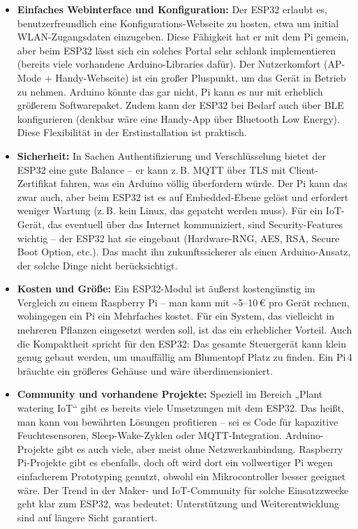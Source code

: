 \begin{itemize}[leftmargin=*]
    \item \textbf{Einfaches Webinterface und Konfiguration:} Der ESP32 erlaubt es, benutzerfreundlich eine Konfigurations-Webseite zu hosten, etwa um initial WLAN-Zugangsdaten einzugeben. Diese Fähigkeit hat er mit dem Pi gemein, aber beim ESP32 lässt sich ein solches Portal sehr schlank implementieren (bereits viele vorhandene Arduino-Libraries dafür). Der Nutzerkomfort (AP-Mode + Handy-Webseite) ist ein großer Pluspunkt, um das Gerät in Betrieb zu nehmen. Arduino könnte das gar nicht, Pi kann es nur mit erheblich größerem Softwarepaket. Zudem kann der ESP32 bei Bedarf auch über BLE konfigurieren (denkbar wäre eine Handy-App über Bluetooth Low Energy). Diese Flexibilität in der Erstinstallation ist praktisch.
    
    \item \textbf{Sicherheit:} In Sachen Authentifizierung und Verschlüsselung bietet der ESP32 eine gute Balance – er kann z.\,B. MQTT über TLS mit Client-Zertifikat fahren, was ein Arduino völlig überfordern würde. Der Pi kann das zwar auch, aber beim ESP32 ist es auf Embedded-Ebene gelöst und erfordert weniger Wartung (z.\,B. kein Linux, das gepatcht werden muss). Für ein IoT-Gerät, das eventuell über das Internet kommuniziert, sind Security-Features wichtig – der ESP32 hat sie eingebaut (Hardware-RNG, AES, RSA, Secure Boot Option, etc.). Das macht ihn zukunftssicherer als einen Arduino-Ansatz, der solche Dinge nicht berücksichtigt.
    
    \item \textbf{Kosten und Größe:} Ein ESP32-Modul ist äußerst kostengünstig im Vergleich zu einem Raspberry Pi – man kann mit \textasciitilde5–10\,€ pro Gerät rechnen, wohingegen ein Pi ein Mehrfaches kostet. Für ein System, das vielleicht in mehreren Pflanzen eingesetzt werden soll, ist das ein erheblicher Vorteil. Auch die Kompaktheit spricht für den ESP32: Das gesamte Steuergerät kann klein genug gebaut werden, um unauffällig am Blumentopf Platz zu finden. Ein Pi\,4 bräuchte ein größeres Gehäuse und wäre überdimensioniert.
    
    \item \textbf{Community und vorhandene Projekte:} Speziell im Bereich „Plant watering IoT“ gibt es bereits viele Umsetzungen mit dem ESP32. Das heißt, man kann von bewährten Lösungen profitieren – sei es Code für kapazitive Feuchtesensoren, Sleep-Wake-Zyklen oder MQTT-Integration. Arduino-Projekte gibt es auch viele, aber meist ohne Netzwerkanbindung. Raspberry Pi-Projekte gibt es ebenfalls, doch oft wird dort ein vollwertiger Pi wegen einfacherem Prototyping genutzt, obwohl ein Mikrocontroller besser geeignet wäre. Der Trend in der Maker- und IoT-Community für solche Einsatzzwecke geht klar zum ESP32, was bedeutet: Unterstützung und Weiterentwicklung sind auf längere Sicht garantiert.
\end{itemize}

